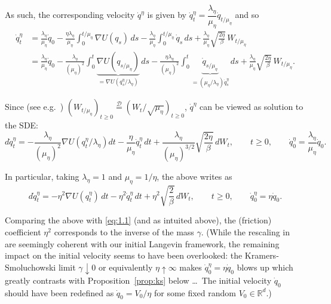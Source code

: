 \documentclass[11pt]{article}
\begin{document}
As such, the corresponding velocity $\dot{q}^{\eta}$ is given by
$\dot{q}_t^{\eta}=\dfrac{\lambda_{\eta}}{\mu_{\eta}}\dot{q}_{t/\mu_{\eta}}$ and so
\[
\begin{aligned}
\dot{q}_t^{\eta}
&= \frac{\lambda_{\eta}}{\mu_{\eta}}\dot{q}_0
- \frac{\eta\lambda_{\eta}}{\mu_{\eta}}\int_0^{t/\mu_{\eta}} \nabla U(q_s)\,ds
- \frac{\lambda_{\eta}}{\mu_{\eta}}\int_0^{t/\mu_{\eta}} \dot{q}_s\,ds
+ \frac{\lambda_{\eta}}{\mu_{\eta}}\sqrt{\frac{2\eta}{\beta}}\,W_{t/\mu_{\eta}} \\
&= \frac{\lambda_{\eta}}{\mu_{\eta}}\dot{q}_0
- \frac{\lambda_{\eta}}{(\mu_{\eta})^2}\int_0^{t} \underbrace{\nabla U(q_{s/\mu_{\eta}})}_{=\nabla U(q_s^{\eta}/\lambda_{\eta})}\,ds
- \frac{\eta\lambda_{\eta}}{(\mu_{\eta})^2}\int_0^{t} \underbrace{\dot{q}_{s/\mu_{\eta}}}_{=(\mu_{\eta}/\lambda_{\eta})\dot{q}_s^{\eta}}\,ds
+ \frac{\lambda_{\eta}}{\mu_{\eta}}\sqrt{\frac{2\eta}{\beta}}\,W_{t/\mu_{\eta}}.
\end{aligned}
\]


Since (see e.g.~\cite{ks91}) $(W_{t/\mu_{\eta}})_{t\ge0}\overset{\mathcal{D}}{=}(W_t/\sqrt{\mu_{\eta}})_{t\ge0}$, $\dot q^{\eta}$ can be viewed as solution to the SDE:
\[
d\dot q_t^{\eta}
=
-\frac{\lambda_{\eta}}{(\mu_{\eta})^2}\nabla U\!\left(q_t^{\eta}/\lambda_{\eta}\right)dt
-\frac{\eta}{\mu_{\eta}}\dot q_t^{\eta}\,dt
+\frac{\lambda_{\eta}}{(\mu_{\eta})^{3/2}}\sqrt{\frac{2\eta}{\beta}}\,dW_t,
\qquad t\ge0,
\qquad
\dot q_0^{\eta}=\frac{\lambda_{\eta}}{\mu_{\eta}}\dot q_0.
\]

In particular, taking $\lambda_{\eta}=1$ and $\mu_{\eta}=1/\eta$, the above writes as
\[
d\dot q_t^{\eta}
=
-\eta^2\nabla U(q_t^{\eta})\,dt-\eta^2\dot q_t^{\eta}\,dt+\eta^2\sqrt{\frac{2}{\beta}}\,dW_t,
\qquad t\ge0,
\qquad
\dot q_0^{\eta}=\eta\dot q_0.
\]

Comparing the above with \eqref{eq:1.1} (and as intuited above), the (friction) coefficient $\eta^2$ corresponds to the inverse of the mass $\gamma$.
(While the rescaling in~\cite{p14} are seemingly coherent with our initial Langevin framework, the remaining impact on the initial velocity seems to have been overlooked: the Kramers-Smoluchowski limit $\gamma\downarrow 0$ or equivalently $\eta\uparrow\infty$ makes $\dot q_0^{\eta}=\eta\dot q_0$ blows up which greatly contrasts with Proposition~\ref{prop:ks} below \dots\ The initial velocity $\dot q_0$ should have been redefined as $\dot q_0=V_0/\eta$ for some fixed random $V_0\in\mathbb{R}^d$.)
\end{document}
